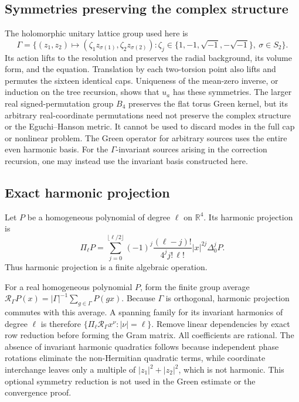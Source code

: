 \documentclass[11pt,a4paper,twoside]{article}
\numberwithin{equation}{section}
\theoremstyle{definition}
\theoremstyle{remark}
\newcommand{\ii}{\sqrt{-1}}
\begin{document}
\subsection{Symmetries preserving the complex structure}
\label{subsec:Kummer-symmetries}
The holomorphic unitary lattice group used here is
\[
\Gamma=\{(z_1,z_2)\mapsto
(\zeta_1z_{\sigma(1)},\zeta_2z_{\sigma(2)}):
\zeta_j\in\{1,-1,\ii,-\ii\},\ \sigma\in S_2\}.
\]
Its action lifts to the resolution and preserves the radial
background, its volume form, and the equation. Translation by each
two-torsion point also lifts and permutes the sixteen identical caps.
Uniqueness of the mean-zero inverse, or induction on the tree
recursion, shows that \(u_a\) has these symmetries.
The larger real signed-permutation group \(B_4\) preserves the flat
torus Green kernel, but its arbitrary real-coordinate permutations
need not preserve the complex structure or the Eguchi--Hanson metric.
It cannot be used to discard modes in the full cap or nonlinear problem.
The Green operator for arbitrary sources uses the entire even harmonic
basis. For the \(\Gamma\)-invariant sources arising in the correction
recursion, one may instead use the invariant basis constructed here.

\subsection{Exact harmonic projection}
\label{subsec:exact-harmonic-projection}

Let \(P\) be a homogeneous polynomial of degree \(\ell\) on
\(\mathbb R^4\).  Its harmonic projection is
\[
\Pi_\ell P
=
\sum_{j=0}^{\lfloor\ell/2\rfloor}
(-1)^j
\frac{
(\ell-j)!
}{
4^jj!\,\ell!
}
|x|^{2j}\Delta_0^jP.
\]
Thus harmonic projection is a finite algebraic operation.

For a real homogeneous polynomial \(P\), form the finite group average
\(\mathcal R_\Gamma P(x)=|\Gamma|^{-1}\sum_{g\in\Gamma}P(gx)\).
Because \(\Gamma\) is orthogonal, harmonic projection commutes with
this average. A spanning family for its invariant harmonics of
degree \(\ell\) is therefore
\(\{\Pi_\ell\mathcal R_\Gamma x^\nu:|\nu|=\ell\}\).
Remove linear dependencies by exact row reduction before forming
the Gram matrix. All coefficients are rational. The absence of
invariant harmonic quadratics follows because independent phase
rotations eliminate the non-Hermitian quadratic terms, while coordinate
interchange leaves only a multiple of \(|z_1|^2+|z_2|^2\), which is
not harmonic. This optional symmetry reduction is not used in the
Green estimate or the convergence proof.
\end{document}
